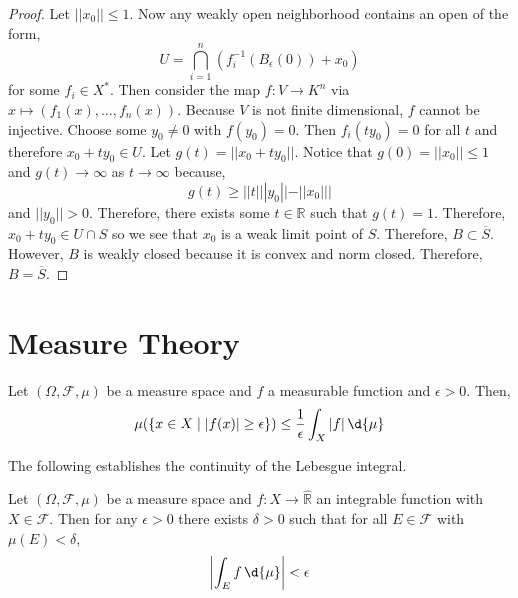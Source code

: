\documentclass[12pt]{article}
\newcommand{\R}{\mathbb{R}}
\renewcommand{\F}{\mathcal{F}}
\begin{document}
\begin{proof}
Let $|| x_0 || \le 1$. Now any weakly open neighborhood contains an open of the form,
\[ U = \bigcap_{i = 1}^n (f_i^{-1}(B_\epsilon(0)) + x_0) \]
for some $f_i \in X^*$. Then consider the map $f : V \to K^n$ via $x \mapsto (f_1(x), \dots, f_n(x))$. Because $V$ is not finite dimensional, $f$ cannot be injective. Choose some $y_0 \neq 0$ with $f(y_0) = 0$. Then $f_i(t y_0) = 0$ for all $t$ and therefore $x_0 + t y_0 \in U$. Let $g(t) = || x_0 + t y_0 ||$. Notice that $g(0) = || x_0 || \le 1$ and $g(t) \to \infty$ as $t \to \infty$ because,
\[ g(t) \ge | |t| || y_0|| - || x_0 || | \]
and $|| y_0 || > 0$. Therefore, there exists some $t \in \R$ such that $g(t) = 1$. Therefore, $x_0 + t y_0 \in U \cap S$ so we see that $x_0$ is a weak limit point of $S$. Therefore, $B \subset \overline{S}$. However, $B$ is weakly closed because it is convex and norm closed. Therefore, $B = \overline{S}$.
\end{proof}

\section{Measure Theory}

\begin{prop}[Chebyshev]
Let $(\Omega, \F, \mu)$ be a measure space and $f$ a measurable function and $\epsilon > 0$. Then,
\[ \mu(\{x \in X \mid | f(x) | \ge \epsilon \}) \le \frac{1}{\epsilon} \int_X |f| \, \d{\mu} \]
\end{prop}

\begin{rmk}
The following establishes the continuity of the Lebesgue integral. 
\end{rmk}

\begin{prop}
Let $(\Omega, \F, \mu)$ be a measure space and $f : X \to \hat{\R}$ an integrable function with $X \in \F$. Then for any $\epsilon > 0$ there exists $\delta > 0$ such that for all $E \in \F$ with $\mu(E) < \delta$,
\[ \left| \int_E f \, \d{\mu} \right| < \epsilon \]
\end{prop}
\end{document}
